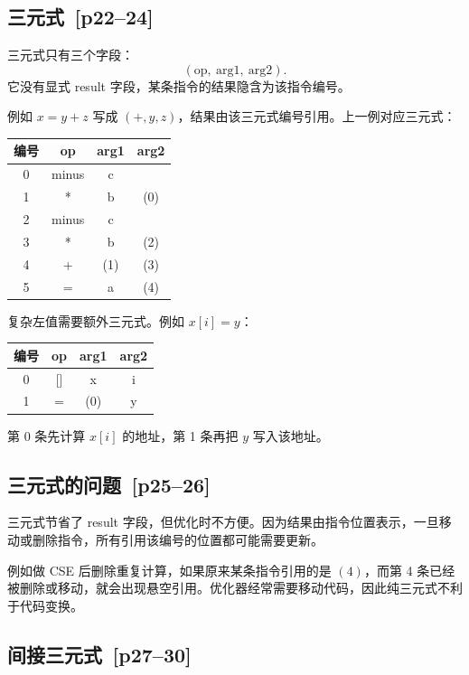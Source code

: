 \documentclass[UTF8,fontset=none,11pt]{ctexart}
\newenvironment{defbox}[1][]{%
  \par\medskip\noindent{\color{defrule}\rule{\linewidth}{1.1pt}}\par\nopagebreak
  \noindent{\bfseries\color{defrule}#1}\par\nopagebreak\smallskip}%
  {\par\nopagebreak\smallskip\noindent{\color{defrule}\rule{\linewidth}{0.4pt}}\par\medskip}
\newcommand{\pg}[1]{\texorpdfstring{{\small\color{graytext}\,[p#1]}}{ [p#1]}}
\begin{document}
\subsection{三元式 \pg{22--24}}

\begin{defbox}[Triple]
三元式只有三个字段：
\[
(\mathrm{op},\ \mathrm{arg1},\ \mathrm{arg2}).
\]
它没有显式 result 字段，某条指令的结果隐含为该指令编号。
\end{defbox}

例如 \(x=y+z\) 写成 \((+,y,z)\)，结果由该三元式编号引用。上一例对应三元式：

\begin{center}
\small
\begin{tabular}{c|ccc}
\toprule
编号 & op & arg1 & arg2 \\
\midrule
0 & minus & c &  \\
1 & * & b & (0) \\
2 & minus & c &  \\
3 & * & b & (2) \\
4 & + & (1) & (3) \\
5 & = & a & (4) \\
\bottomrule
\end{tabular}
\end{center}

复杂左值需要额外三元式。例如 \(x[i]=y\)：
\begin{center}
\small
\begin{tabular}{c|ccc}
\toprule
编号 & op & arg1 & arg2 \\
\midrule
0 & [] & x & i \\
1 & = & (0) & y \\
\bottomrule
\end{tabular}
\end{center}
第 0 条先计算 \(x[i]\) 的地址，第 1 条再把 \(y\) 写入该地址。

\subsection{三元式的问题 \pg{25--26}}

三元式节省了 result 字段，但优化时不方便。因为结果由指令位置表示，一旦移动或删除指令，所有引用该编号的位置都可能需要更新。

例如做 CSE 后删除重复计算，如果原来某条指令引用的是 \((4)\)，而第 4 条已经被删除或移动，就会出现悬空引用。优化器经常需要移动代码，因此纯三元式不利于代码变换。

\subsection{间接三元式 \pg{27--30}}
\end{document}
